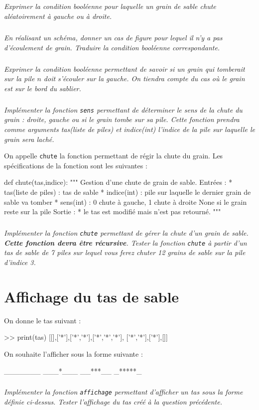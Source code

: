 \subparagraph{}
\textit{Exprimer la condition booléenne pour laquelle un grain de sable chute aléatoirement à gauche ou à droite.}

\subparagraph{}
\textit{En réalisant un schéma, donner un cas de figure pour lequel il n'y a pas d'écoulement de grain. Traduire la condition booléenne correspondante.}

\subparagraph{}
\textit{Exprimer la condition booléenne permettant de savoir si un grain qui tomberait sur la pile $n$ doit s'écouler sur la gauche. On tiendra compte du cas où le grain est sur le bord du sablier. }

\subparagraph{}
\textit{Implémenter la fonction \texttt{sens} permettant de déterminer le sens de la chute du grain : droite, gauche ou si le grain tombe sur sa pile. Cette fonction prendra comme arguments tas(liste de piles) et indice(int) l'indice de la pile sur laquelle le grain sera laché.}

\vspace{.25cm}

On appelle \texttt{chute} la fonction permettant de régir la chute du grain. Les spécifications de la fonction sont les suivantes : 
\begin{py}
\begin{python}
def chute(tas,indice):
    """
    Gestion d'une chute de grain de sable.
    Entrées : 
     * tas(liste de piles) : tas de sable
     * indice(int) : pile sur laquelle le dernier 
		grain de sable va tomber
     * sens(int) : 0 chute à gauche, 1 chute à droite
		None si le grain reste sur la pile
    Sortie : 
     * le tas est modifié mais n'est pas retourné.
    """
\end{python}
\end{py}

\subparagraph{}
\textit{Implémenter la fonction \texttt{chute} permettant de gérer la chute d'un grain de sable. \textbf{Cette fonction devra être récursive}. Tester la fonction \texttt{chute} à partir d'un tas de sable de 7 piles sur lequel vous ferez chuter 12 grains de sable sur la pile d'indice 3.}

\section*{Affichage du tas de sable}
On donne le tas suivant : 
\begin{py}
\begin{python}
>> print(tas)
    [[],['*'],['*','*'],['*','*','*'], 
		['*','*'],['*'],[]]
\end{python}
\end{py}
On souhaite l'afficher sous la forme suivante : 
\begin{py}
\begin{python}
_______
___*___
__***__
_*****_
\end{python}
\end{py}

\subparagraph{}
\textit{Implémenter la fonction \texttt{affichage} permettant d'afficher un tas sous la forme définie ci-dessus. Tester l'affichage du tas créé à la question précédente.}